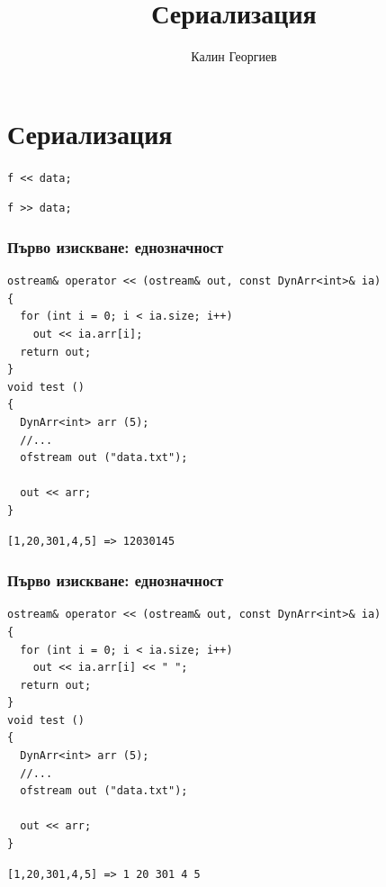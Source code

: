 \documentclass{beamer}
\begin{document}
\title[Обектно ориентирано програмиране]{Сериализация}
\author{Калин Георгиев}
\frame{\titlepage}

\section{Сериализация}

\begin{frame}
\centerline{\texttt{f << data;}}
\centerline{\texttt{f >> data;}}
\end{frame}




\begin{frame}[fragile]
\frametitle{Първо изискване: еднозначност}

\begin{flushleft}
\begin{lstlisting}
ostream& operator << (ostream& out, const DynArr<int>& ia)
{
  for (int i = 0; i < ia.size; i++)
    out << ia.arr[i];
  return out;
}
void test ()
{
  DynArr<int> arr (5);
  //...
  ofstream out ("data.txt");

  out << arr;
}
\end{lstlisting}
\end{flushleft}

\begin{lstlisting}
[1,20,301,4,5] => 12030145
\end{lstlisting}

\end{frame}


\begin{frame}[fragile]
\frametitle{Първо изискване: еднозначност}

\begin{flushleft}
\begin{lstlisting}
ostream& operator << (ostream& out, const DynArr<int>& ia)
{
  for (int i = 0; i < ia.size; i++)
    out << ia.arr[i] << " ";
  return out;
}
void test ()
{
  DynArr<int> arr (5);
  //...
  ofstream out ("data.txt");

  out << arr;
}
\end{lstlisting}
\end{flushleft}

\begin{lstlisting}
[1,20,301,4,5] => 1 20 301 4 5
\end{lstlisting}

\end{frame}
\end{document}
